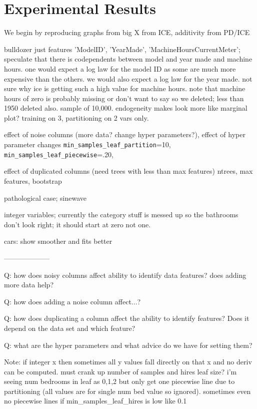 \documentclass[12pt]{article}
\begin{document}
\section{Experimental Results}\label{sec:applications}

We begin by reproducing graphs from \cite{ICE} big X from ICE, additivity from PD/ICE

bulldozer  just features 'ModelID', 'YearMade', 'MachineHoursCurrentMeter'; speculate that there is codependents between model and year made and machine hours. one would expect a log law for the model ID as some are much more expensive than the others. we would also expect a log law for the year made. not sure why ice is getting such a high value for machine hours.  note that machine hours of zero is probably missing or don't want to say so we deleted; less than 1950 deleted also.  sample of 10,000. endogeneity makes look more like marginal plot? training on 3, partitioning on 2 vars only.


effect of noise columns (more data? change hyper parameters?), effect of hyper parameter changes
                 {\tt min\_samples\_leaf\_partition}=10,
                 {\tt min\_samples\_leaf\_piecewise}=.20,

effect of duplicated columns (need trees with less than max features)
	ntrees, max features, bootstrap

pathological case; sinewave

integer variables; currently the category stuff is messed up so the bathrooms don't look right; it should start at zero not one.

cars: show smoother and fits better

--------------------

Q: how does noisy columns affect ability to identify data features? does adding more data help?

Q: how does adding a noise column affect...?

Q: how does duplicating a column affect the ability to identify features? Does it depend on the data set and which feature?

Q: what are the hyper parameters and what advice do we have for setting them?

Note: if integer x then sometimes all y values fall directly on that x and no deriv can be computed.  must crank up number of samples and hires leaf size? i'm seeing num bedrooms in leaf as 0,1,2 but only get one piecewise line due to partitioning (all values are for single num bed value so ignored). sometimes even no piecewise lines if min\_samples\_leaf\_hires is low like 0.1
\end{document}
